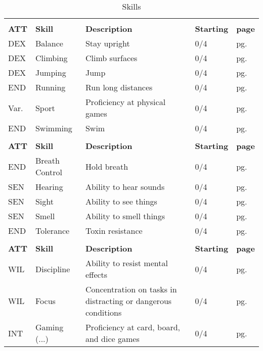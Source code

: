 \begin{center}
    \unclassedrowcolors
    \begin{xltabular}{\textwidth}{l l X l l}
        \caption{Skills}\label{tab:skills} \endfoot
         \\*
        \textbf{ATT} & \textbf{Skill} & \textbf{Description} & \textbf{Starting} & \textbf{page} \\*
        DEX & Balance & Stay upright & 0/4 & pg. \pageref{skill:balance} \\
        DEX & Climbing & Climb surfaces & 0/4 & pg. \pageref{skill:climbing} \\
        DEX & Jumping & Jump & 0/4 & pg. \pageref{skill:jumping} \\
        END & Running & Run long distances & 0/4 & pg. \pageref{skill:running} \\
        Var. & Sport & Proficiency at physical games & 0/4 & pg. \pageref{skill:sport} \\
        END & Swimming & Swim & 0/4 & pg. \pageref{skill:swimming} \\
         \\*
        \textbf{ATT} & \textbf{Skill} & \textbf{Description} & \textbf{Starting} & \textbf{page} \\*
        END & Breath Control & Hold breath & 0/4 & pg. \pageref{skill:hearing} \\
        SEN & Hearing & Ability to hear sounds & 0/4 & pg. \pageref{skill:hearing} \\
        SEN & Sight & Ability to see things & 0/4 & pg. \pageref{skill:sight} \\
        SEN & Smell & Ability to smell things & 0/4 & pg. \pageref{skill:smell} \\
        END & Tolerance & Toxin resistance & 0/4 & pg. \pageref{skill:tolerance} \\
         \\*
        \textbf{ATT} & \textbf{Skill} & \textbf{Description} & \textbf{Starting} & \textbf{page} \\*
        WIL & Discipline & Ability to resist mental effects & 0/4 & pg. \pageref{skill:self-control} \\
        WIL & Focus & Concentration on tasks in distracting or dangerous conditions & 0/4 & pg. \pageref{skill:concentration} \\
        INT & Gaming (...) & Proficiency at card, board, and dice games & 0/4 & pg. \pageref{skill:gaming} \\

\end{xltabular}
\end{center}
